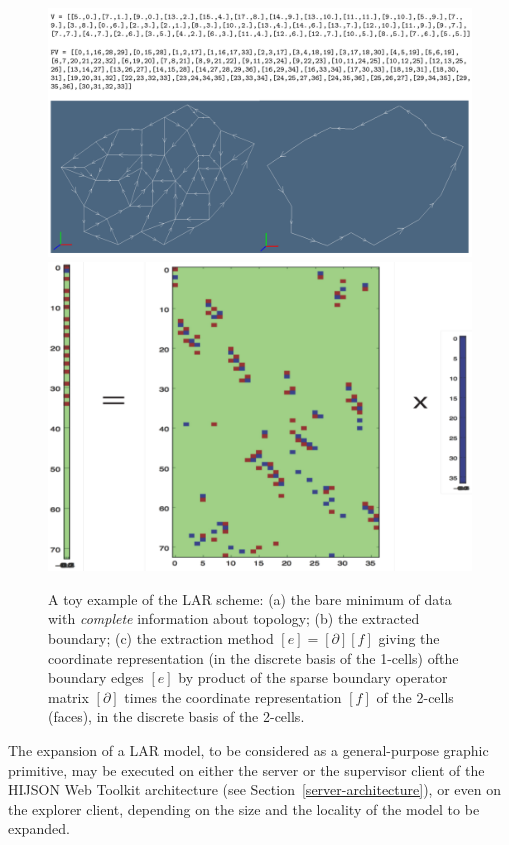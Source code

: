 \documentclass{sig-alternate}
\begin{document}
\begin{figure}[htbp] %
 \centering
 \includegraphics[width=0.5\linewidth]{images/minimum} 
 \hfill
 \includegraphics[width=0.4\linewidth]{images/boundary} 
 \caption{A toy example of the LAR scheme: (a) the bare minimum of data with \emph{complete} information about topology; (b) the extracted boundary; (c) the extraction method $[e] = [\partial][f]$ giving the coordinate representation (in the discrete basis of the 1-cells) ofthe boundary edges $[e]$ by product of the sparse boundary operator matrix $[\partial]$ times the coordinate representation $[f]$ of the 2-cells (faces), in the discrete basis of the 2-cells.}
 \label{fig:minimum}
\end{figure}


The expansion of a LAR model, to be considered as a general-purpose graphic primitive, may be executed on either the server or the supervisor client of the HIJSON Web Toolkit architecture (see Section~\ref{server-architecture}), or even on the explorer client, depending on the size and the locality of the model to be expanded.

\end{document}

